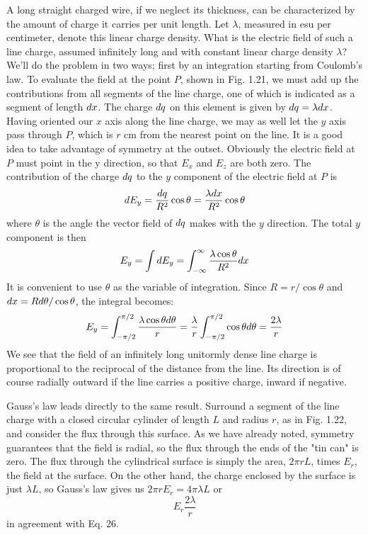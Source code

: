 A long straight charged wire, if we neglect its thickness, can be
characterized by the amount of charge it carries per unit length. Let
$\lambda$, measured in esu per centimeter, denote this linear charge density.
What is the electric field of such a line charge, assumed infinitely
long and with constant linear charge density $\lambda$? We'll do the problem
in two ways; first by an integration starting from Coulomb's law.
To evaluate the field at the point $P$, shown in Fig. 1.21, we must
add up the contributions from all segments of the line charge, one of
which is indicated as a segment of length $d x$. The charge $d q$ on this
element is given by $d q = \lambda d x$. Having oriented our $x$ axis along the
line charge, we may as well let the $y$ axis pass through $P$, which is
$r$ cm from the nearest point on the line. It is a good idea to take advantage
of symmetry at the outset. Obviously the electric field at
$P$ must point in the y direction, so that $E_x$ and $E_z$ are both zero. The
contribution of the charge $d q$ to the $y$ component of the electric field
at $P$ is
\begin{equation}
  d E_y = \frac{d q}{R^2}\cos\theta = \frac{\lambda d x}{R^2}\cos\theta
\end{equation}
where $\theta$ is the angle the vector field of $d q$ makes with the $y$ direction.
The total $y$ component is then
\begin{equation}
  E_y = \int d E_y = \int_{-\infty}^\infty \frac{\lambda\cos\theta}{R^2}d x
\end{equation}
It is convenient to use $\theta$ as the variable of integration. Since
$R = r/\cos \theta$ and $d x = R d\theta/\cos \theta$, the integral becomes:
\begin{equation}
  E_y = \int_{-\pi/2}^{\pi/2} \frac{\lambda\cos\theta d\theta}{r}
      = \frac{\lambda}{r} \int_{-\pi/2}^{\pi/2} \cos\theta d\theta
      = \frac{2\lambda}{r}
\end{equation}
We see that the field of an infinitely long unitormly dense line charge
is proportional to the reciprocal of the distance from the line. Its
direction is of course radially outward if the line carries a positive
charge, inward if negative.

Gauss's law leads directly to the same result. Surround a segment
of the line charge with a closed circular cylinder of length $L$ and
radius $r$, as in Fig. 1.22, and consider the flux through this surface.
As we have already noted, symmetry guarantees that the field is
radial, so the flux through the ends of the "tin can" is zero. The flux
through the cylindrical surface is simply the area, $2\pi r L$, times $E_r$, the
field at the surface. On the other hand, the charge enclosed by the
surface is just $\lambda L$, so Gauss's law gives us $2\pi r E_r=4\pi\lambda L$ or
\begin{equation}
  E_r  \frac{2\lambda}{r}
\end{equation}
in agreement with Eq. 26.

